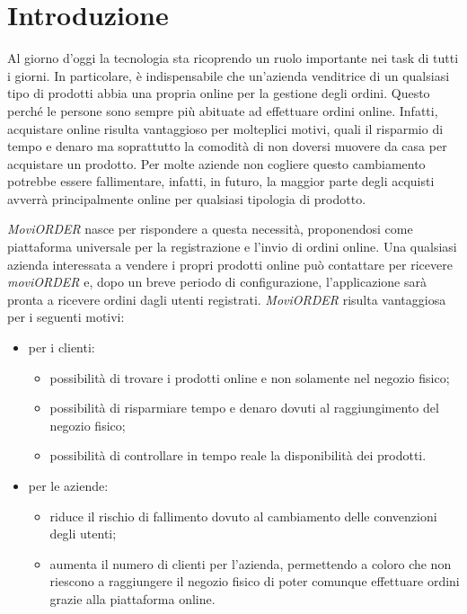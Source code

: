 
\chapter{Introduzione}
\label{cap:introduzione}

Al giorno d'oggi la tecnologia sta ricoprendo un ruolo importante nei task di tutti i giorni. In particolare, è indispensabile che un'azienda venditrice di un qualsiasi tipo di prodotti abbia una propria  online per la gestione degli ordini. Questo perché le persone sono sempre più abituate ad effettuare ordini online. Infatti, acquistare online risulta vantaggioso per molteplici motivi, quali il risparmio di tempo e denaro ma soprattutto la comodità di non doversi muovere da casa per acquistare un prodotto. Per molte aziende non cogliere questo cambiamento potrebbe essere fallimentare, infatti, in futuro, la maggior parte degli acquisti avverrà principalmente online per qualsiasi tipologia di prodotto. 

\textit{MoviORDER} nasce per rispondere a questa necessità, proponendosi come piattaforma universale per la registrazione e l'invio di ordini online. Una qualsiasi azienda interessata a vendere i propri prodotti online può contattare \visione{} per ricevere \textit{moviORDER} e, dopo un breve periodo di configurazione, l'applicazione sarà pronta a ricevere ordini dagli utenti registrati. 
\textit{MoviORDER} risulta vantaggiosa per i seguenti motivi:
\begin{itemize}
	\item per i clienti:
	\begin{itemize}
		\item possibilità di trovare i prodotti online e non solamente nel negozio fisico;
		\item possibilità di risparmiare tempo e denaro dovuti al raggiungimento del negozio fisico;
		\item possibilità di controllare in tempo reale la disponibilità dei prodotti.
	\end{itemize}
	\item per le aziende:
	\begin{itemize}
		\item riduce il rischio di fallimento dovuto al cambiamento delle convenzioni degli utenti;
		\item aumenta il numero di clienti per l'azienda, permettendo a coloro che non riescono a raggiungere il negozio fisico di poter comunque effettuare ordini grazie alla piattaforma online.
	\end{itemize}
\end{itemize}

